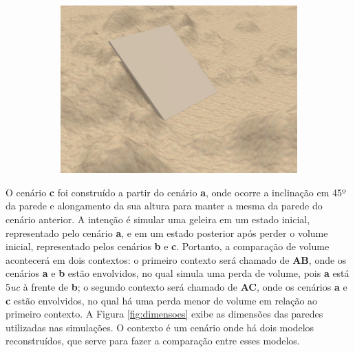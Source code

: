 \begin{figure}[H]
\begin{subfigure}[t]{0.328\textwidth}
        \includegraphics[width=\textwidth]{dados/figuras/scene4.png}
        \caption{}
        \label{fig:scene3}
    \end{subfigure}
\end{figure}

O cenário \textbf{c} foi construído a partir do cenário \textbf{a}, onde ocorre a inclinação em 45º da parede e alongamento da sua altura para manter a mesma da parede do cenário anterior.
A intenção é simular uma geleira em um estado inicial, representado pelo cenário \textbf{a}, e em um estado posterior após perder o volume inicial, representado pelos cenários \textbf{b} e \textbf{c}.
Portanto, a comparação de volume acontecerá em dois contextos: o primeiro contexto será chamado de \textbf{AB}, onde os cenários \textbf{a} e \textbf{b} estão envolvidos, no qual simula uma perda de volume, pois \textbf{a} está 5\textit{uc} à frente de \textbf{b}; o segundo contexto será chamado de \textbf{AC}, onde os cenários \textbf{a} e \textbf{c} estão envolvidos, no qual há uma perda menor de volume em relação ao primeiro contexto.
A Figura \ref{fig:dimensoes} exibe as dimensões das paredes utilizadas nas simulações.
O contexto é um cenário onde há dois modelos reconstruídos, que serve para fazer a comparação entre esses modelos.

